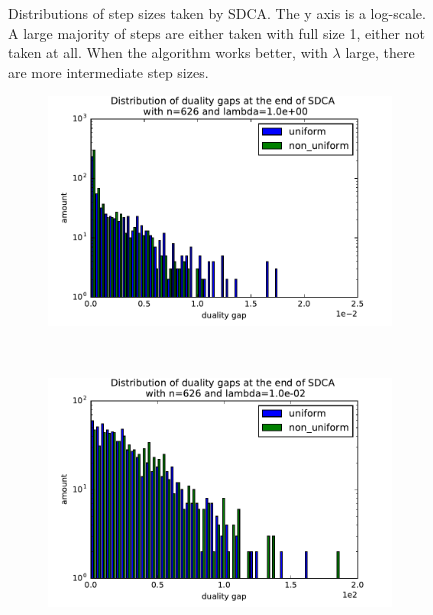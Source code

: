 \documentclass{article}
\DeclareMathOperator{\1}{\mathbb{1}}
\begin{document}
\begin{figure}[ht]
\begin{subfigure}[t]{0.3\textwidth}
    \end{subfigure}
    \caption{Distributions of step sizes taken by SDCA. The y axis is a log-scale. A large majority of steps are either taken with full size 1, either not taken at all. When the algorithm works better, with $\lambda$ large, there are more intermediate step sizes.}
	\label{ocr step sizes}
\end{figure}

\begin{figure}[ht]
    \centering
    \begin{subfigure}[t]{0.3\textwidth}
        \centering
        \includegraphics[width=\textwidth]{images/20170914_040308_ocr_optdualgaps.pdf}
    \end{subfigure}
    ~
    \begin{subfigure}[t]{0.3\textwidth}
        \centering
        \includegraphics[width=\textwidth]{images/20170914_041703_ocr_optdualgaps.pdf}

\end{subfigure}
\end{figure}
\end{document}
